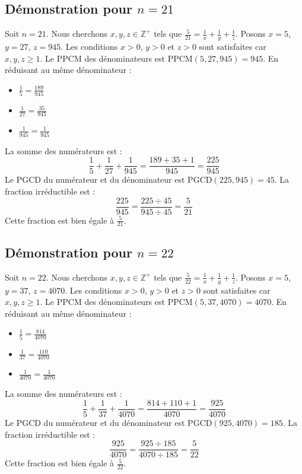 \documentclass[11pt,a4paper]{article}
\begin{document}
\subsection{Démonstration pour $n = 21$}
Soit $n = 21$. Nous cherchons $x, y, z \in \mathbb{Z}^{+}$ tels que $\frac{5}{21} = \frac{1}{x} + \frac{1}{y} + \frac{1}{z}$.
Posons $x = 5$, $y = 27$, $z = 945$.
Les conditions $x > 0$, $y > 0$ et $z > 0$ sont satisfaites car $x, y, z \geq 1$.
Le PPCM des dénominateurs est $\text{PPCM}(5, 27, 945) = 945$.
En réduisant au même dénominateur :
\begin{itemize}
    \item $\frac{1}{5} = \frac{189}{945}$
    \item $\frac{1}{27} = \frac{35}{945}$
    \item $\frac{1}{945} = \frac{1}{945}$
\end{itemize}
La somme des numérateurs est :
$$ \frac{1}{5} + \frac{1}{27} + \frac{1}{945} = \frac{189 + 35 + 1}{945} = \frac{225}{945} $$
Le PGCD du numérateur et du dénominateur est $\text{PGCD}(225, 945) = 45$.
La fraction irréductible est :
$$ \frac{225}{945} = \frac{225 \div 45}{945 \div 45} = \frac{5}{21} $$
Cette fraction est bien égale à $\frac{5}{21}$.

\subsection{Démonstration pour $n = 22$}
Soit $n = 22$. Nous cherchons $x, y, z \in \mathbb{Z}^{+}$ tels que $\frac{5}{22} = \frac{1}{x} + \frac{1}{y} + \frac{1}{z}$.
Posons $x = 5$, $y = 37$, $z = 4070$.
Les conditions $x > 0$, $y > 0$ et $z > 0$ sont satisfaites car $x, y, z \geq 1$.
Le PPCM des dénominateurs est $\text{PPCM}(5, 37, 4070) = 4070$.
En réduisant au même dénominateur :
\begin{itemize}
    \item $\frac{1}{5} = \frac{814}{4070}$
    \item $\frac{1}{37} = \frac{110}{4070}$
    \item $\frac{1}{4070} = \frac{1}{4070}$
\end{itemize}
La somme des numérateurs est :
$$ \frac{1}{5} + \frac{1}{37} + \frac{1}{4070} = \frac{814 + 110 + 1}{4070} = \frac{925}{4070} $$
Le PGCD du numérateur et du dénominateur est $\text{PGCD}(925, 4070) = 185$.
La fraction irréductible est :
$$ \frac{925}{4070} = \frac{925 \div 185}{4070 \div 185} = \frac{5}{22} $$
Cette fraction est bien égale à $\frac{5}{22}$.
\end{document}
